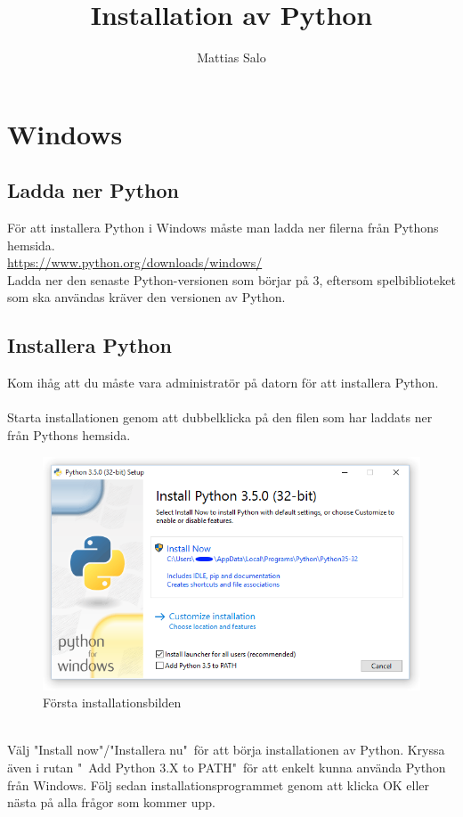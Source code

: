 \documentclass{article}
\author{Mattias Salo}
\title{Installation av Python}
\begin{document}

\maketitle
\tableofcontents

\newpage
{}

\section{Windows}
\subsection{Ladda ner Python}
För att installera Python i Windows måste man ladda ner filerna från Pythons hemsida. \\
\url{https://www.python.org/downloads/windows/}\\
Ladda ner den senaste Python-versionen som börjar på 3, eftersom spelbiblioteket som ska användas kräver den versionen av Python.\\
\subsection{Installera Python}
Kom ihåg att du måste vara administratör på datorn för att installera Python.\\
\\
Starta installationen genom att dubbelklicka på den filen som har laddats ner från Pythons hemsida.\\
\begin{figure}[h!]
  \includegraphics[width=\linewidth]{win_installer.png}
  \caption{Första installationsbilden}
  \label{fig:win}
\end{figure}\\
Välj "Install now"/"Installera nu"\ för att börja installationen av Python. Kryssa även i rutan "\ Add Python 3.X to PATH"\ för att enkelt kunna använda Python från Windows. Följ sedan installationsprogrammet genom att klicka OK eller nästa på alla frågor som kommer upp.
\end{document}

